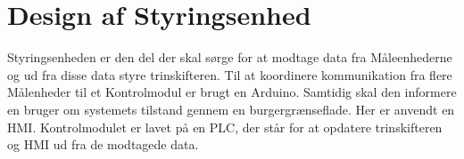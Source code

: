 
\chapter{Design af Styringsenhed}

Styringsenheden er den del der skal sørge for at modtage data fra Måleenhederne og ud fra disse data styre trinskifteren. Til at koordinere kommunikation fra flere Målenheder til et Kontrolmodul er brugt en Arduino. Samtidig skal den informere en bruger om systemets tilstand gennem en burgergrænseflade. Her er anvendt en HMI. Kontrolmodulet er lavet på en PLC, der står for at opdatere trinskifteren og HMI ud fra de modtagede data.

